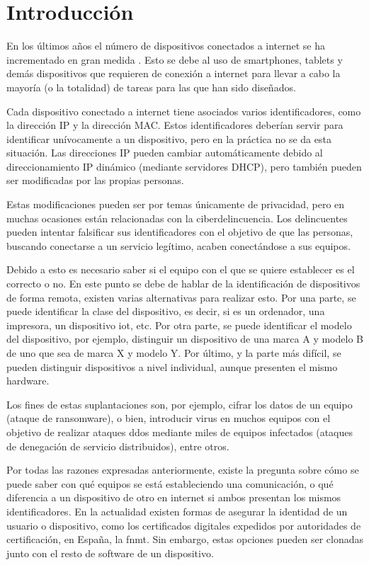 
\chapter{Introducción} \label{chap:intro}

En los últimos años el número de dispositivos conectados a internet se ha incrementado en gran medida \cite{84Billio53:online}. Esto se debe al uso de smartphones, tablets y demás dispositivos que requieren de conexión a internet para llevar a cabo la mayoría (o la totalidad) de tareas para las que han sido diseñados.

Cada dispositivo conectado a internet tiene asociados varios identificadores, como la dirección IP y la dirección MAC. Estos identificadores deberían servir para identificar unívocamente a un dispositivo, pero en la práctica no se da esta situación. Las direcciones IP pueden cambiar automáticamente debido al direccionamiento IP dinámico (mediante servidores DHCP), pero también pueden ser modificadas por las propias personas. 

Estas modificaciones pueden ser por temas únicamente de privacidad, pero en muchas ocasiones están relacionadas con la ciberdelincuencia. Los delincuentes pueden intentar falsificar sus identificadores con el objetivo de que las personas, buscando conectarse a un servicio legítimo, acaben conectándose a sus equipos.

Debido a esto es necesario saber si el equipo con el que se quiere establecer es el correcto o no. En este punto se debe de hablar de la identificación de dispositivos de forma remota, existen varias alternativas para realizar esto. Por una parte, se puede identificar la clase del dispositivo, es decir, si es un ordenador, una impresora, un dispositivo \acrfull{iot}, etc. Por otra parte, se puede identificar el modelo del dispositivo, por ejemplo, distinguir un dispositivo de una marca A y modelo B de uno que sea de marca X y modelo Y. Por último, y la parte más difícil, se pueden distinguir dispositivos a nivel individual, aunque presenten el mismo hardware.

Los fines de estas suplantaciones son, por ejemplo, cifrar los datos de un equipo (ataque de ransomware), o bien, introducir virus en muchos equipos con el objetivo de realizar ataques \acrfull{ddos} mediante miles de equipos infectados (ataques de denegación de servicio distribuidos), entre otros.

Por todas las razones expresadas anteriormente, existe la pregunta sobre cómo se puede saber con qué equipos se está estableciendo una comunicación, o qué diferencia a un dispositivo de otro en internet si ambos presentan los mismos identificadores. En la actualidad existen formas de asegurar la identidad de un usuario o dispositivo, como los certificados digitales expedidos por autoridades de certificación, en España, la \acrfull{fnmt}. Sin embargo, estas opciones pueden ser clonadas junto con el resto de software de un dispositivo.

